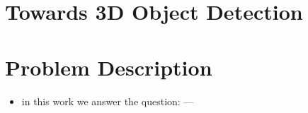 \section{Towards 3D Object Detection}
\lipsum[2-5]

        
        

\section{Problem Description}
\lipsum[2-3]
    \begin{itemize}
        \item in this work we answer the question: ---
    \end{itemize}

